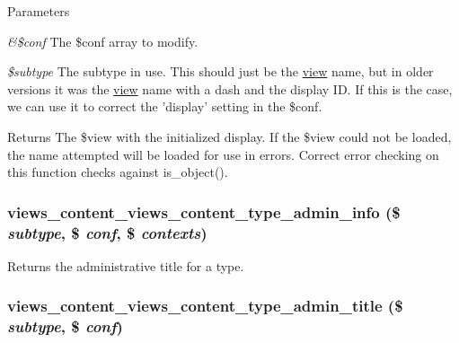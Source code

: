 \begin{DoxyParams}{Parameters}
\item[{\em \&\$conf}]The \$conf array to modify. \item[{\em \$subtype}]The subtype in use. This should just be the \hyperlink{classview}{view} name, but in older versions it was the \hyperlink{classview}{view} name with a dash and the display ID. If this is the case, we can use it to correct the 'display' setting in the \$conf. \end{DoxyParams}
\begin{DoxyReturn}{Returns}
The \$view with the initialized display. If the \$view could not be loaded, the name attempted will be loaded for use in errors. Correct error checking on this function checks against is\_\-object(). 
\end{DoxyReturn}
\hypertarget{views__content_2plugins_2content__types_2views_8inc_a91d97e1d609d2c4b68e45802a759d4e1}{
\subsubsection[{views\_\-content\_\-views\_\-content\_\-type\_\-admin\_\-info}]{\setlength{\rightskip}{0pt plus 5cm}views\_\-content\_\-views\_\-content\_\-type\_\-admin\_\-info (\$ {\em subtype}, \/  \$ {\em conf}, \/  \$ {\em contexts})}}
\label{views__content_2plugins_2content__types_2views_8inc_a91d97e1d609d2c4b68e45802a759d4e1}
Returns the administrative title for a type. \hypertarget{views__content_2plugins_2content__types_2views_8inc_a33c06994371d4cc130507549e7f546ba}{
\subsubsection[{views\_\-content\_\-views\_\-content\_\-type\_\-admin\_\-title}]{\setlength{\rightskip}{0pt plus 5cm}views\_\-content\_\-views\_\-content\_\-type\_\-admin\_\-title (\$ {\em subtype}, \/  \$ {\em conf})}}
